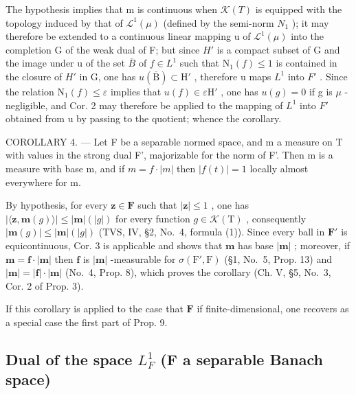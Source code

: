 The hypothesis implies that m is continuous when \(\mathcal{K}(T)\) is equipped with the topology induced by that of \(\mathcal{L}^{1}(\mu)\) (defined by the semi-norm \(N_{1}\) ); it may therefore be extended to a continuous linear mapping u of \(\mathcal{L}^{1}(\mu)\) into the completion G of the weak dual of F; but since \(H'\) is a compact subset of G and the image under u of the set \(\overline{B}\) of \(f \in L^{1}\) such that \(\mathrm{N}_{1}(f) \leqslant 1\) is contained in the closure of \(H'\) in G, one has \(u(\overline{\mathrm{B}}) \subset \mathrm{H}'\) , therefore u maps \(L^{1}\) into \(F'\) . Since the relation \(\mathrm{N}_{1}(f) \leqslant \varepsilon\) implies that \(u(f) \in \varepsilon\mathrm{H}'\) , one has \(u(g) = 0\) if g is \(\mu\) -negligible, and Cor. 2 may therefore be applied to the mapping of \(L^{1}\) into \(F'\) obtained from u by passing to the quotient; whence the corollary.

COROLLARY 4. --- Let F be a separable normed space, and m a measure on T with values in the strong dual F', majorizable for the norm of F'. Then m is a measure with base \textbar m\textbar, and if \(m = f \cdot |m|\) then \(|f(t)| = 1\) locally almost everywhere for \textbar m\textbar.

By hypothesis, for every \(\mathbf{z} \in \mathbf{F}\) such that \(|\mathbf{z}| \leqslant 1\) , one has \(|\langle \mathbf{z}, \mathbf{m}(g) \rangle| \leqslant |\mathbf{m}|(|g|)\) for every function \(g \in \mathcal{K}(\mathrm{T})\) , consequently \(|\mathbf{m}(g)| \leqslant |\mathbf{m}|(|g|)\) (TVS, IV, §2, No.~4, formula (1)). Since every ball in \(\mathbf{F}'\) is equicontinuous, Cor. 3 is applicable and shows that \(\mathbf{m}\) has base \(|\mathbf{m}|\) ; moreover, if \(\mathbf{m} = \mathbf{f} \cdot |\mathbf{m}|\) then \(\mathbf{f}\) is \(|\mathbf{m}|\) -measurable for \(\sigma(\mathrm{F}', \mathrm{F})\) (§1, No.~5, Prop. 13) and \(|\mathbf{m}| = |\mathbf{f}| \cdot |\mathbf{m}|\) (No.~4, Prop. 8), which proves the corollary (Ch. V, §5, No.~3, Cor. 2 of Prop. 3).

If this corollary is applied to the case that \(\mathbf{F}\) if finite-dimensional, one recovers as a special case the first part of Prop. 9.

\subsection{\texorpdfstring{Dual of the space \(L_{F}^{1}\) (F a separable Banach space)}{Dual of the space L sub F superscript 1 (F a separable Banach space)}}

